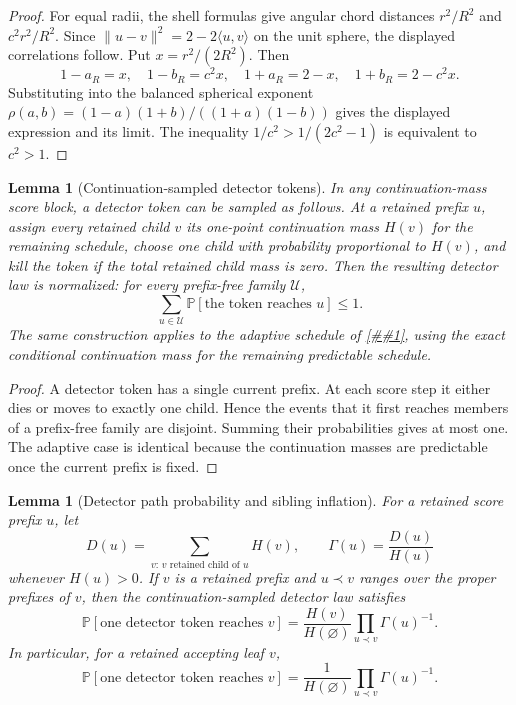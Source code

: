 \documentclass[10pt]{article}
\newcommand{\cref}[1]{\ref{##1}}
\newtheorem{lemma}[theorem]{Lemma}
\theoremstyle{definition}
\newcommand{\Prb}{\mathbb{P}}
\newcommand{\ip}[2]{\langle #1,#2\rangle}
\begin{document}
\begin{proof}
   For equal radii, the shell formulas give angular chord distances
   $r^2/R^2$ and $c^2r^2/R^2$. Since
   $\|u-v\|^2=2-2\ip{u}{v}$ on the unit sphere, the displayed correlations
   follow. Put $x=r^2/(2R^2)$. Then
   \[
      1-a_R=x,\quad 1-b_R=c^2x,\quad
      1+a_R=2-x,\quad 1+b_R=2-c^2x.
   \]
   Substituting into the balanced spherical exponent
   $\rho(a,b)=(1-a)(1+b)/((1+a)(1-b))$ gives the displayed expression and
   its limit. The inequality $1/c^2>1/(2c^2-1)$ is equivalent to $c^2>1$.
\end{proof}

\begin{lemma}[Continuation-sampled detector tokens]\label{lem:continuation-detector}
   In any continuation-mass score block, a detector token can be sampled as follows. At a retained prefix $u$, assign every retained child $v$ its one-point continuation mass $H(v)$ for the remaining schedule, choose one child with probability proportional to $H(v)$, and kill the token if the total retained child mass is zero. Then the resulting detector law is normalized: for every prefix-free family $\mathcal U$,
   \[
      \sum_{u\in\mathcal U}\Prb[\text{the token reaches }u]\le1.
   \]
   The same construction applies to the adaptive schedule of \cref{def:regular-adaptive-score}, using the exact conditional continuation mass for the remaining predictable schedule.
\end{lemma}

\begin{proof}
   A detector token has a single current prefix. At each score step it either dies or moves to exactly one child. Hence the events that it first reaches members of a prefix-free family are disjoint. Summing their probabilities gives at most one. The adaptive case is identical because the continuation masses are predictable once the current prefix is fixed.
\end{proof}

\begin{lemma}[Detector path probability and sibling inflation]\label{lem:detector-inflation}
   For a retained score prefix $u$, let
   \[
      D(u)=\sum_{v:\,v\text{ retained child of }u}H(v),
      \qquad
      \Gamma(u)=\frac{D(u)}{H(u)}
   \]
   whenever $H(u)>0$. If $v$ is a retained prefix and $u\prec v$ ranges over the proper prefixes of $v$, then the continuation-sampled detector law satisfies
   \[
      \Prb[\text{one detector token reaches }v]
      =
      \frac{H(v)}{H(\varnothing)}
      \prod_{u\prec v}\Gamma(u)^{-1}.
   \]
   In particular, for a retained accepting leaf $v$,
   \[
      \Prb[\text{one detector token reaches }v]
      =
      \frac{1}{H(\varnothing)}
      \prod_{u\prec v}\Gamma(u)^{-1}.
   \]
\end{lemma}
\end{document}
